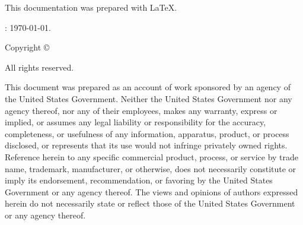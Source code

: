 {
\small
\parskip=0pt
\parindent=0pt
%
%
%
\par\noindent
This documentation was prepared with \LaTeX.
%
%
%
\par\noindent
\mbox{}
\vspace*{2in}
%
\ifx\userdraft\undefined\else
\par{}: \today.
\vspace*{1ex}
\fi
%
\vspace*{1ex}
%
\ifodd\usercopyright
\par\noindent
Copyright \copyright\  \usercopyrightext
\vspace*{1ex}
\par\noindent All rights reserved.
\fi
%
\vspace*{1in}
\par\noindent
This document was prepared as an account of work sponsored by an agency of the
United States Government.  Neither the United States Government nor any agency
thereof, nor any of their employees, makes any warranty, express or implied,
or assumes any legal liability or responsibility for the accuracy, completeness,
or usefulness of any information, apparatus, product, or process disclosed, or
represents that its use would not infringe privately owned rights.  Reference
herein to any specific commercial product, process, or service by trade name,
trademark, manufacturer, or otherwise, does not necessarily constitute or imply
its endorsement, recommendation, or favoring by the United States Government or
any agency thereof.  The views and opinions of authors expressed herein do not
necessarily state or reflect those of the United States Government or any agency
thereof.
%
%
%
\vfill
{
\footnotesize
%
}}
